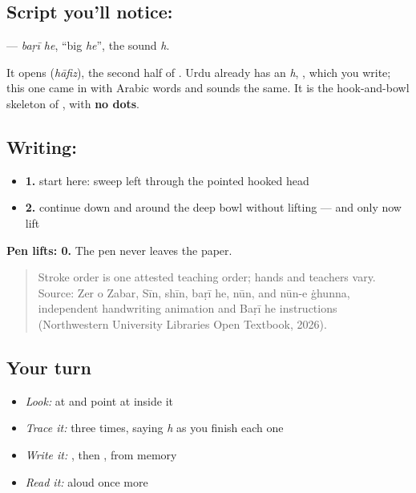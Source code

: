 \subsection*{Script you'll notice: }
\textbf{} — \emph{baṛī he}, \textquotedblleft{}big \emph{he}\textquotedblright{}, the sound \emph{h}.

It opens \textbf{} (\emph{hāfiz}), the second half of \textbf{ }. Urdu already has an \emph{h}, \textbf{}, which you write; this one came in with Arabic words and sounds the same. It is the hook-and-bowl skeleton of \textbf{}, with \textbf{no dots}.

\subsection*{Writing: }

\begin{itemize}
\raggedright
  \item \textbf{1.} start here: sweep left through the pointed hooked head
  \item \textbf{2.} continue down and around the deep bowl without lifting — and only now lift
\end{itemize}

\textbf{Pen lifts: 0.} The pen never leaves the paper.

\begin{quote}
Stroke order is one attested teaching order; hands and teachers vary. Source: Zer o Zabar, Sīn, shīn, baṛī he, nūn, and nūn-e ġhunna, independent  handwriting animation and Baṛī he instructions (Northwestern University Libraries Open Textbook, 2026).
\end{quote}

\subsection*{Your turn}
\begin{itemize}
\raggedright
  \item \emph{Look:} at \textbf{} and point at  inside it
  \item \emph{Trace it:}  three times, saying \emph{h} as you finish each one
  \item \emph{Write it:} , then , from memory
  \item \emph{Read it:} \textbf{} aloud once more
\end{itemize}

